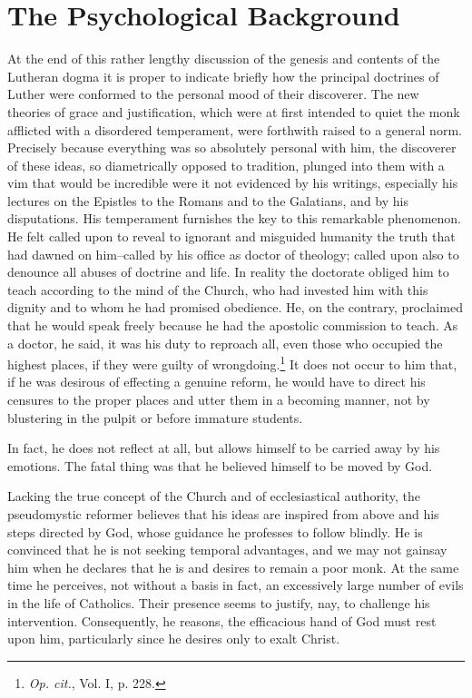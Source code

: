 \section{The Psychological Background}

At the end of this rather lengthy discussion of the genesis and
contents of the Lutheran dogma it is proper to indicate briefly how
the principal doctrines of Luther were conformed to the personal
mood of their discoverer. The new theories of grace and justification,
which were at first intended to quiet the monk afflicted
with a disordered temperament, were forthwith raised to a general
norm. Precisely because everything was so absolutely personal with
him, the discoverer of these ideas, so diametrically opposed to tradition,
plunged into them with a vim that would be incredible were
it not evidenced by his writings, especially his lectures on the
Epistles to the Romans and to the Galatians, and by his disputations. His
temperament furnishes the key to this remarkable phenomenon. He felt called
upon to reveal to ignorant and misguided
humanity the truth that had dawned on him--called by his office as
doctor of theology; called upon also to denounce all abuses of doctrine
and life. In reality the doctorate obliged him to teach according
to the mind of the Church, who had invested him with this dignity
and to whom he had promised obedience. He, on the contrary, proclaimed
that he would speak freely because he had the apostolic
commission to teach. As a doctor, he said, it was his duty to reproach
all, even those who occupied the highest places, if they were
guilty of wrongdoing.\footnote{\textit{Op. cit.}, Vol. I, p. 228.}
It does not occur to him that, if he was
desirous of effecting a genuine reform, he would have to direct his
censures to the proper places and utter them in a becoming manner,
not by blustering in the pulpit or before immature students.

In fact, he does not reflect at all, but allows himself to be carried
away by his emotions. The fatal thing was that he believed himself to be moved by God.

Lacking the true concept of the Church and of ecclesiastical authority,
the pseudomystic reformer believes that his ideas are inspired
from above and his steps directed by God, whose guidance
he professes to follow blindly. He is convinced that he is not seeking
temporal advantages, and we may not gainsay him when he
declares that he is and desires to remain a poor monk. At the same
time he perceives, not without a basis in fact, an excessively large
number of evils in the life of Catholics. Their presence seems
to justify, nay, to challenge his intervention. Consequently, he reasons,
the efficacious hand of God must rest upon him, particularly
since he desires only to exalt Christ.

